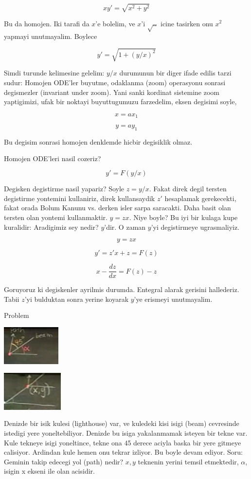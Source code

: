 \documentclass[12pt,fleqn]{article}\usepackage{../common}
\begin{document}
\[ xy' = \sqrt{x^2 + y^2} \]

Bu da homojen. Iki tarafi da $x$'e bolelim, ve $x$'i $\sqrt{..}$ icine
tasirken onu $x^2$ yapmayi unutmayalim. Boylece

\[ y' = \sqrt{1+(y/x)^2} \]

Simdi turunde kelimesine gelelim: $y/x$ durumunun bir diger ifade
edilis tarzi sudur: Homojen ODE'ler buyutme, odaklanma (zoom)
operasyonu sonrasi degismezler (invariant under zoom). Yani sanki
kordinat sistemine zoom yaptigimizi, ufak bir noktayi buyuttugumuzu
farzedelim, eksen degisimi soyle,

\[ x = ax_1 \]

\[ y = ay_1 \]

Bu degisim sonrasi homojen denklemde hicbir degisiklik olmaz. 

Homojen ODE'leri nasil cozeriz?

\[ y' = F(y/x) \]

Degisken degistirme nasil yapariz? Soyle $z = y/x$. Fakat direk degil
tersten degistirme yontemini kullaniriz, direk kullansaydik $z'$
hesaplamak gerekecekti, fakat orada Bolum Kanunu vs. derken isler
sarpa saracakti. Daha basit olan tersten olan yontemi kullanmaktir. 
$y
= zx$. Niye boyle? Bu iyi bir kulaga kupe kuralidir: Aradigimiz sey
nedir? $y$'dir. O zaman $y$'yi degistirmeye ugrasmaliyiz.

\[ y = zx \]

\[ y' = z'x + z = F(z)\]

\[ x - \frac{dz}{dx} = F(z) - z \]

Goruyoruz ki degiskenler ayrilmis durumda. Entegral alarak gerisini
hallederiz. Tabii $z$'yi bulduktan sonra yerine koyarak $y$'ye
erismeyi unutmayalim. 

Problem

\includegraphics[height=2cm]{4_1.png}

\includegraphics[height=2cm]{4_2.png}

Denizde bir isik kulesi (lighthouse) var, ve kuledeki kisi isigi
(beam) cevresinde istedigi yere yoneltebiliyor. Denizde bu isiga
yakalanmamak isteyen bir tekne var. Kule tekneye isigi yoneltince,
tekne ona 45 derece aciyla baska bir yere gitmeye calisiyor. Ardindan
kule hemen onu tekrar izliyor. Bu boyle devam ediyor. Soru: Geminin
takip edecegi yol (path) nedir? $x,y$ teknenin yerini temsil
etmektedir, $\alpha$, isigin x ekseni ile olan acisidir. 
\end{document}
